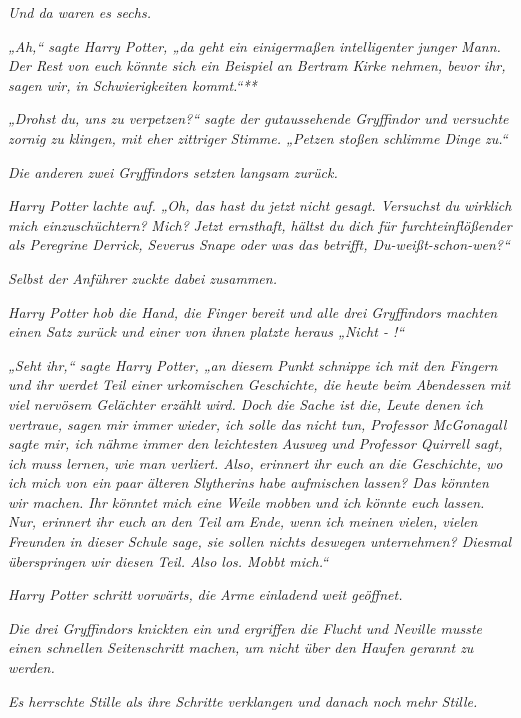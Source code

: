 {\emph{Und da waren es sechs.}

\emph{„Ah,“ sagte Harry Potter, „da geht ein einigermaßen intelligenter junger Mann. Der Rest von euch könnte sich ein Beispiel an Bertram Kirke nehmen, bevor ihr, sagen wir, in Schwierigkeiten kommt.“**}

\emph{„Drohst du, uns zu verpetzen?“ sagte der gutaussehende Gryffindor und versuchte zornig zu klingen, mit eher zittriger Stimme. „Petzen stoßen schlimme Dinge zu.“}

\emph{Die anderen zwei Gryffindors setzten langsam zurück.}

\emph{Harry Potter} \emph{lachte auf. „Oh, das hast du} \emph{jetzt} \emph{nicht gesagt. Versuchst du} \emph{\emph{wirklich}} \emph{mich einzuschüchtern?} \emph{\emph{Mich?}} \emph{Jetzt ernsthaft, hältst du dich für furchteinflößender als Peregrine Derrick, Severus Snape oder was das betrifft, Du-weißt-schon-wen?“}

\emph{Selbst der Anführer zuckte dabei zusammen.}

\emph{Harry Potter hob die Hand, die Finger bereit und alle drei Gryffindors machten einen Satz zurück und einer von ihnen platzte heraus „Nicht - !“}

\emph{„Seht ihr,“ sagte Harry Potter, „an diesem Punkt schnippe ich mit den Fingern und ihr werdet Teil einer urkomischen Geschichte, die heute beim Abendessen mit viel nervösem Gelächter erzählt wird. Doch die Sache ist die, Leute denen ich vertraue, sagen mir immer wieder, ich solle das nicht tun, Professor McGonagall sagte mir, ich nähme immer den leichtesten} \emph{Ausweg und Professor Quirrell sagt, ich muss lernen, wie man verliert. Also, erinnert ihr euch an die Geschichte, wo ich mich von ein paar älteren Slytherins habe aufmischen lassen? Das könnten wir machen. Ihr könntet mich eine Weile mobben und ich könnte euch lassen. Nur, erinnert ihr euch an den Teil am Ende, wenn ich meinen vielen, vielen Freunden in dieser Schule sage, sie sollen nichts deswegen unternehmen? Diesmal überspringen wir diesen} \emph{Teil. Also los. Mobbt mich.“}

\emph{Harry Potter schritt vorwärts,} \emph{die} \emph{Arme einladend weit geöffnet.}

\emph{Die drei Gryffindors knickten ein und} \emph{ergriffen die Flucht} \emph{und Neville musste einen schnellen Seitenschritt machen, um nicht über den Haufen gerannt zu werden.}

\emph{Es herrschte Stille als ihre Schritte verklangen und danach noch mehr Stille.}

}
